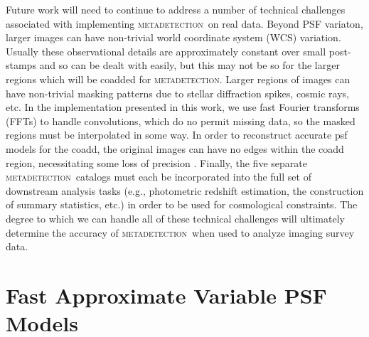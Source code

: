 \documentclass[fleqn,useAMS,usenatbib]{mnras}
\newcommand{\mdet}{\textsc{metadetection}}
\begin{document}
Future work will need to continue to address a number of technical challenges
associated with implementing \mdet\ on real data. Beyond PSF variaton, larger
images can have non-trivial world coordinate system (WCS) variation.  Usually
these observational details are approximately constant over small post-stamps
and so can be dealt with easily, but this may not be so for the larger regions
which will be coadded for \mdet. Larger regions of images can have non-trivial
masking patterns due to stellar diffraction spikes, cosmic rays, etc. In the
implementation presented in this work, we use fast Fourier transforms (FFTs) to
handle convolutions, which do no permit missing data, so the masked regions
must be interpolated in some way.  In order to reconstruct accurate psf models
for the coadd, the original images can have no edges within the coadd region,
necessitating some loss of precision \citep{ArmstrongCoadd}.  Finally, the five
separate \mdet\ catalogs must each be incorporated into the full set of
downstream analysis tasks (e.g., photometric redshift estimation, the
construction of summary statistics, etc.) in order to be used for cosmological
constraints. The degree to which we can handle all of these technical
challenges will ultimately determine the accuracy of \mdet\ when used to
analyze imaging survey data.




\appendix

\section{Fast Approximate Variable PSF Models}\label{app:pspsf}
\end{document}
